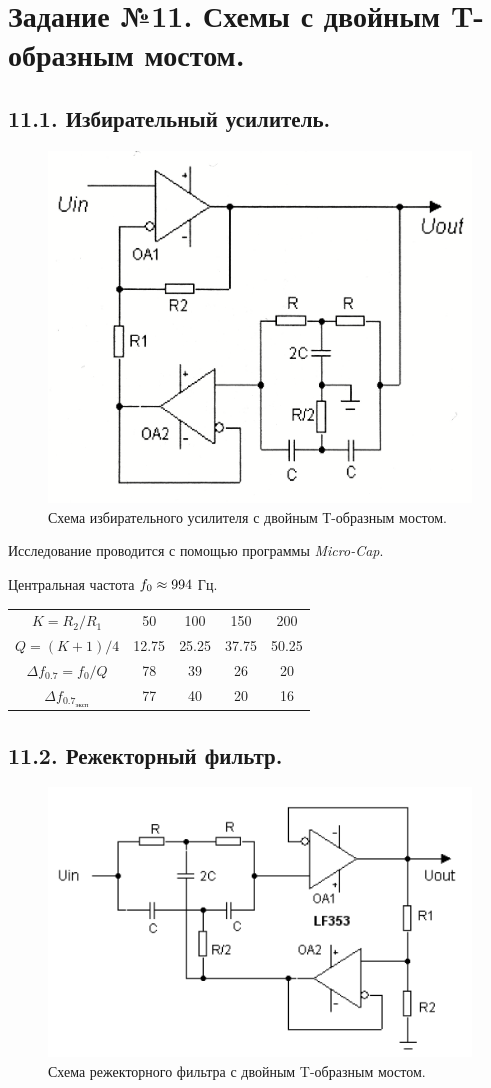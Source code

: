 \documentclass[a4paper, 12pt, twoside]{article}
\newcommand*{\hm}[1]{#1\nobreak\discretionary{}
	{\hbox{$\mathsurround=0pt #1$}}{}}
\begin{document}
\section*{Задание №11. Схемы с двойным T-образным мостом.}

\subsection*{11.1. Избирательный усилитель.}

\begin{figure}[H]
	\centering
	\includegraphics[width =  0.4\linewidth]{IMG_0667}
	\caption{Схема избирательного усилителя с двойным Т-образным мостом.}
	
\end{figure}

Исследование проводится с помощью программы \textit{Micro-Cap}.

\begin{center}
Центральная частота $f_0 \hm{\approx} 994$ Гц.
\end{center}

\begin{table}[H]
	\centering
	\begin{tabular}{c|cccc}
		\toprule
		$K = R_2/R_1$ & 50 & 100 & 150   & 200\\
		$Q = (K+1)/4$ & 12.75 & 25.25 & 37.75 & 50.25\\	$\Delta f_{0.7} = f_0/Q$&78& 39 & 26& 20 \\
		$\Delta f_{0.7_{\text{эксп}}}$&77&40&20&16\\ \bottomrule
	\end{tabular}
\end{table}

\subsection*{11.2. Режекторный фильтр.}
\begin{figure}[H]
	\centering
	\includegraphics[width =  0.5\linewidth]{112}
	\caption{Схема режекторного фильтра с двойным T-образным мостом.}
	
\end{figure}
\end{document}
